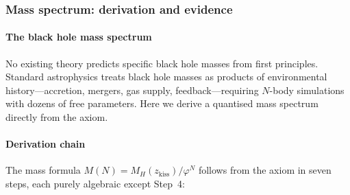 \documentclass[12pt,a4paper]{article}
\begin{document}
\subsubsection{Mass spectrum: derivation and evidence}
\label{sec:bh-mass}

\paragraph{The black hole mass spectrum}
\label{sec:bh-mass-spectrum}

No existing theory predicts specific black hole masses from first principles.  Standard astrophysics treats black hole masses as products of environmental history---accretion, mergers, gas supply, feedback---requiring $N$-body simulations with dozens of free parameters.  Here we derive a quantised mass spectrum directly from the axiom.

\paragraph{Derivation chain}

The mass formula $M(N) = M_H(z_{\mathrm{kiss}})/\varphi^N$ follows from the axiom in seven steps, each purely algebraic except Step~4:
\end{document}
